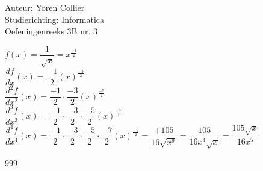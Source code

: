 \documentclass[a4paper]{article}
\newcommand{\Lh}{\left(} %
\newcommand{\Rh}{\right)}
\begin{document}
\noindent \large Auteur: Yoren Collier \\
\noindent \large Studierichting: Informatica\\
\noindent \large Oefeningenreeks 3B nr. 3\\

\medskip

\normalsize

$f(x) = \dfrac{1}{\sqrt{x}} = x^{\tfrac{-1}{2}}$\\

$\dfrac{df}{dx}(x) = \dfrac{-1}{2} \Lh x \Rh ^{\tfrac{-3}{2}}$\\

$\dfrac{d^2f}{dx^2}(x) = \dfrac{-1}{2} \cdot \dfrac{-3}{2} \Lh x \Rh ^{\tfrac{-5}{2}}$\\

$\dfrac{d^3f}{dx^3}(x) = \dfrac{-1}{2} \cdot \dfrac{-3}{2} \cdot \dfrac{-5}{2} \Lh x \Rh ^{\tfrac{-7}{2}}$\\

$\dfrac{d^4f}{dx^4}(x) = \dfrac{-1}{2} \cdot \dfrac{-3}{2} \cdot \dfrac{-5}{2} \cdot \dfrac{-7}{2} \Lh x \Rh ^{\tfrac{-9}{2}} = \dfrac{+105}{16 \sqrt{x^9}} = \dfrac{105}{16x^4 \sqrt{x}} = \dfrac{105 \sqrt{x}}{16x^5}$\\

\begin{thebibliography}{999}
\end{thebibliography}
\end{document}
